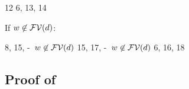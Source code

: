 \begin{bycase}
\begin{derivatioN}{12}
{  \cup
   \cond{\varII\in\efvar{\exprI}}
        {\cvarv{\absO}{\varI}\cup\cvarv{\exprI}{\varII}}
        {\emptyset}
 \linK{=}
 \emptyset\cup\setI{\var}\cup\cvarv{\expr}{\varI}\cup\cvarv{\exprI}{\varII}}
{12}
\stepL
{\cvarv{\esbsO{(\absO)}}{\varII}
 \linK{=}
 \cond{\varII\neq\varI}{\cvarv{\absO}{\varII}}{\emptyset}
  \cup
   \cond{\varII\in\efvar{\exprI}}
        {\cvarv{\absO}{\varI}\cup\cvarv{\exprI}{\varII}}
        {\emptyset}}
{6, 13, 14}
\end{derivatioN}
If $w\not\in\mathcal{FV}(d)$:
\begin{derivatioN}{12}
\step{\cvarv{\abs{\var}{\typ}{\esbsO{\expr}}}{\varII}=
      \setI{\var}\cup\cvarv{\expr}{\varII}\cup\emptyset}
     {8, 15, \hyp\ $w\not\in\mathcal{FV}(d)$}
\step
{\cond{\varII\neq\varI}{\cvarv{\absO}{\varII}}{\emptyset}
  \cup
   \cond{\varII\in\efvar{\exprI}}
        {\cvarv{\absO}{\varI}\cup\cvarv{\exprI}{\varII}}
        {\emptyset}
 \linK{=}
 \setI{\var}\cup\cvarv{\expr}{\varII}\cup\emptyset}
{15, 17, \hyp\ $w\not\in\mathcal{FV}(d)$}
\step
{\cvarv{\esbs{(\absO)}}{\varII}
 \linK{=}
 \cond{\varII\neq\varI}{\cvarv{\absO}{\varII}}{\emptyset}
  \cup
   \cond{\varII\in\efvar{\exprI}}
        {\cvarv{\absO}{\varI}\cup\cvarv{\exprI}{\varII}}
        {\emptyset}}
{6, 16, 18}
\end{derivatioN}

\end{bycase}



\subsection*{Proof of }


